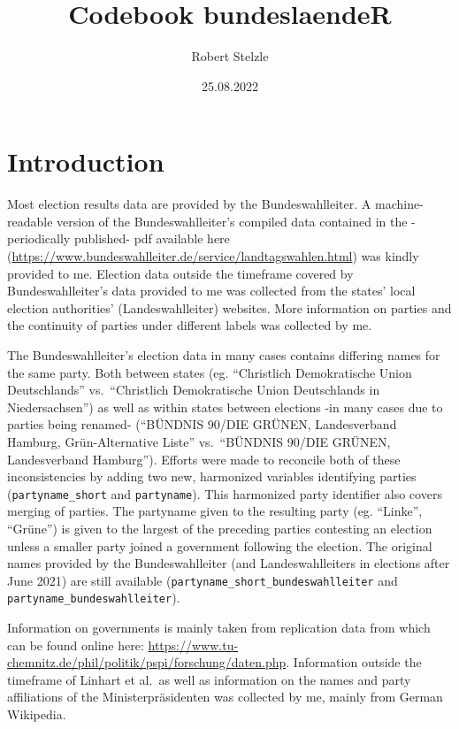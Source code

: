 \documentclass[
]{scrartcl}
\title{Codebook bundeslaendeR}
\author{Robert Stelzle}
\date{25.08.2022}
\begin{document}
\maketitle

{
\setcounter{tocdepth}{1}
\tableofcontents
}
\clearpage

\hypertarget{introduction}{%
\section{Introduction}\label{introduction}}

Most election results data are provided by the Bundeswahlleiter. A
machine-readable version of the Bundeswahlleiter's compiled data
contained in the -periodically published- pdf available here
(\url{https://www.bundeswahlleiter.de/service/landtagswahlen.html}) was
kindly provided to me. Election data outside the timeframe covered by
Bundeswahlleiter's data provided to me was collected from the states'
local election authorities' (Landeswahlleiter) websites. More
information on parties and the continuity of parties under different
labels was collected by me.

The Bundeswahlleiter's election data in many cases contains differing
names for the same party. Both between states (eg. ``Christlich
Demokratische Union Deutschlands'' vs.~``Christlich Demokratische Union
Deutschlands in Niedersachsen'') as well as within states between
elections -in many cases due to parties being renamed- (``BÜNDNIS 90/DIE
GRÜNEN, Landesverband Hamburg, Grün-Alternative Liste'' vs.~``BÜNDNIS
90/DIE GRÜNEN, Landesverband Hamburg''). Efforts were made to reconcile
both of these inconsistencies by adding two new, harmonized variables
identifying parties (\texttt{partyname\_short} and \texttt{partyname}).
This harmonized party identifier also covers merging of parties. The
partyname given to the resulting party (eg. ``Linke'', ``Grüne'') is
given to the largest of the preceding parties contesting an election
unless a smaller party joined a government following the election. The
original names provided by the Bundeswahlleiter (and Landeswahlleiters
in elections after June 2021) are still available
(\texttt{partyname\_short\_bundeswahlleiter} and
\texttt{partyname\_bundeswahlleiter}).

Information on governments is mainly taken from replication data from
\textcite{linhartProportionaleMinisterienaufteilungDeutschen2008} which
can be found online here:
\url{https://www.tu-chemnitz.de/phil/politik/pspi/forschung/daten.php}.
Information outside the timeframe of Linhart et al.~as well as
information on the names and party affiliations of the
Ministerpräsidenten was collected by me, mainly from German Wikipedia.
\end{document}
